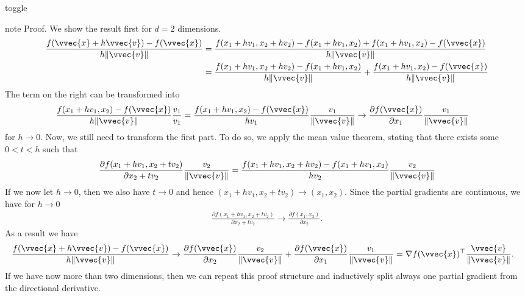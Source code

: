 \documentclass[letterpaper,10pt,english]{jupyterBook}
\begin{document}
\begin{sphinxuseclass}{toggle}
\begin{sphinxadmonition}{note}
\sphinxAtStartPar
Proof. We show the result first for \(d=2\) dimensions.
\begin{align*}
\frac{f(\vvec{x}+h\vvec{v})-f(\vvec{x})}{h\lVert\vvec{v}\rVert} &=\frac{f(x_1+hv_1,x_2 +hv_2)-f(x_1+hv_1,x_2)+f(x_1+hv_1,x_2)-f(\vvec{x})}{h\lVert\vvec{v}\rVert}\\
&= \frac{f(x_1+hv_1,x_2 +hv_2)-f(x_1+hv_1,x_2)}{h\lVert\vvec{v}\rVert}+\frac{f(x_1+hv_1,x_2)-f(\vvec{x})}{h\lVert\vvec{v}\rVert}
\end{align*}
\sphinxAtStartPar
The term on the right can be transformed into
\begin{align*}
\frac{f(x_1+hv_1,x_2)-f(\vvec{x})}{h\lVert\vvec{v}\rVert} \frac{v_1}{v_1} & =
\frac{f(x_1+hv_1,x_2)-f(\vvec{x})}{hv_1} \frac{v_1}{\lVert\vvec{v}\rVert} \rightarrow \frac{\partial f(\vvec{x})}{\partial x_1} \frac{v_1}{\lVert\vvec{v}\rVert}
\end{align*}
\sphinxAtStartPar
for \(h\rightarrow 0\).
Now, we still need to transform the first part. To do so, we apply the mean value theorem, stating that there exists some \(0<t<h\) such that
\begin{align*}
\frac{\partial f(x_1+hv_1,x_2 + tv_2)}{\partial x_2 + tv_2}\frac{v_2}{\lVert\vvec{v}\rVert}=\frac{f(x_1+hv_1,x_2 +hv_2)-f(x_1+hv_1,x_2)}{hv_2} \frac{v_2}{\lVert\vvec{v}\rVert}
\end{align*}
\sphinxAtStartPar
If we now let \(h\rightarrow 0\), then we also have \(t\rightarrow 0\) and hence \((x_1+hv_1,x_2 + tv_2)\rightarrow (x_1,x_2)\). Since the partial gradients are continuous, we have for \(h\rightarrow 0\)
\begin{equation*}
\begin{split}\frac{\partial f(x_1+hv_1,x_2 + tv_2)}{\partial x_2 + tv_2} \rightarrow \frac{\partial f(x_1,x_2)}{\partial x_2}.\end{split}
\end{equation*}
As a result we have
\begin{align*}
\frac{f(\vvec{x}+h\vvec{v})-f(\vvec{x})}{h\lVert\vvec{v}\rVert} &\rightarrow \frac{\partial f(\vvec{x})}{\partial x_2} \frac{v_2}{\lVert\vvec{v}\rVert} + \frac{\partial f(\vvec{x})}{\partial x_1} \frac{v_1}{\lVert\vvec{v}\rVert} = \nabla f(\vvec{x})^\top \frac{\vvec{v}}{\lVert\vvec{v}\rVert}.
\end{align*}
\sphinxAtStartPar
If we have now more than two dimensions, then we can repeat this proof structure and inductively split always one partial gradient from the directional derivative.
\end{sphinxadmonition}

\end{sphinxuseclass}
\end{document}
